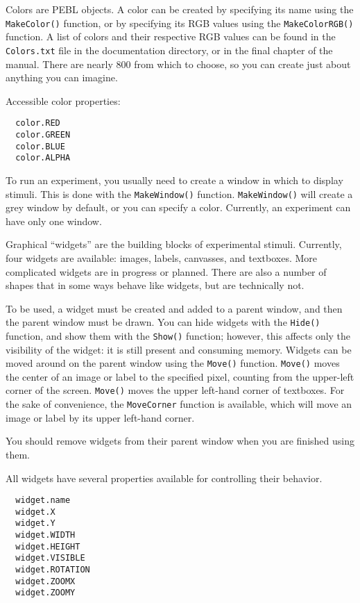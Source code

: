 Colors are PEBL objects.  A color can be created by specifying its name 
using the \texttt{MakeColor()} function, or by specifying its RGB values using the \texttt{MakeColorRGB()} function. A list of colors and their respective RGB values can be found in the \texttt{Colors.txt} file in the documentation directory, or in the final chapter of the manual. There are nearly 800 from which to choose, so you can create 
just about anything you can imagine.

Accessible color properties:
\begin{verbatim}
  color.RED
  color.GREEN
  color.BLUE
  color.ALPHA
\end{verbatim}
 


To run an experiment, you usually need to create a window in which 
to display stimuli.  This is done with the \texttt{MakeWindow()} function. \texttt{MakeWindow()} will create a grey window by default, or you can 
specify a color.  Currently, an experiment can have only one window.



Graphical ``widgets'' are the building blocks of experimental stimuli. 
Currently, four widgets are available: images, labels, canvasses, and textboxes.  
More complicated widgets are in progress or planned.  There are also a number of shapes that in some ways behave like widgets, but are technically not.

To be used, a widget must be created and added to a parent window, and
then the parent window must be drawn.  You can hide widgets with the
\texttt{Hide()} function, and show them with the \texttt{Show()}
function; however, this affects only the visibility of the widget: it
is still present and consuming memory. Widgets can be moved around on
the parent window using the \texttt{Move()} function. \texttt{Move()}
moves the center of an image or label to the specified pixel, counting
from the upper-left corner of the screen. \texttt{Move()} moves the
upper left-hand corner of textboxes.  For the sake of convenience, the
\texttt{MoveCorner} function is available, which will move an image or
label by its upper left-hand corner.

You should remove widgets from their parent window when you are
finished using them.

All widgets have several properties available for controlling their
behavior.
\begin{verbatim}
  widget.name
  widget.X
  widget.Y
  widget.WIDTH
  widget.HEIGHT
  widget.VISIBLE
  widget.ROTATION
  widget.ZOOMX
  widget.ZOOMY
\end{verbatim}
 

